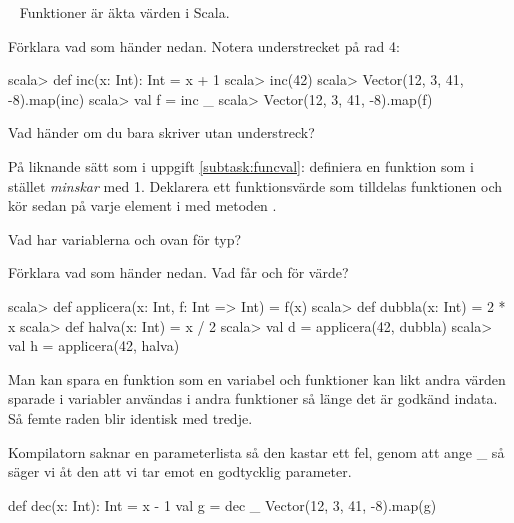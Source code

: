 \QUESTEND









\QUESTBEGIN

\Task  \what~  Funktioner är äkta värden i Scala.

\Subtask \label{subtask:funcval} Förklara vad som händer nedan. Notera understrecket på rad 4:

\begin{REPL}[numbers=left, numberstyle=\color{black}\ttfamily\scriptsize\selectfont]
scala> def inc(x: Int): Int = x + 1
scala> inc(42)
scala> Vector(12, 3, 41, -8).map(inc)
scala> val f = inc _
scala> Vector(12, 3, 41, -8).map(f)
\end{REPL}

\Subtask Vad händer om du bara skriver  utan understreck?

\Subtask På liknande sätt som i uppgift \ref{subtask:funcval}: definiera en funktion  som i stället \emph{minskar} med 1. Deklarera ett funktionsvärde  som tilldelas funktionen  och kör sedan  på varje element i  med metoden .

\Subtask Vad har variablerna  och  ovan för typ?

\Subtask Förklara vad som händer nedan. Vad får  och  för värde?

\begin{REPL}
scala> def applicera(x: Int, f: Int => Int) = f(x)
scala> def dubbla(x: Int) = 2 * x
scala> def halva(x: Int) = x / 2
scala> val d = applicera(42, dubbla)
scala> val h = applicera(42, halva)
\end{REPL}

\SOLUTION


\TaskSolved \what


\SubtaskSolved  Man kan spara en funktion som en variabel och funktioner kan likt andra värden sparade i variabler användas i andra funktioner så länge det är godkänd indata. Så femte raden blir identisk med tredje.

\SubtaskSolved  Kompilatorn saknar en parameterlista så den kastar ett fel, genom att ange \_ så säger vi åt den att vi tar emot en godtycklig parameter.

\SubtaskSolved
\begin{REPLnonum}
def dec(x: Int): Int = x - 1
val g = dec _
Vector(12, 3, 41, -8).map(g)
\end{REPLnonum}

